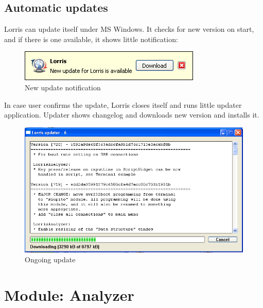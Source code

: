 \documentclass[12pt, a4paper, oneside]{article}
\begin{document}
\subsection{Automatic updates}
Lorris can update itself under MS Windows. It checks for new version on start, and if there is one available, it shows little notification:
\begin{figure}[H]
\begin{center}
\includegraphics[scale=1]{img/update_notify.png}
\caption{New update notification}
\end{center}
\end{figure}
In case user confirms the update, Lorris closes itself and runs little updater application. Updater shows changelog and downloads new version and installs it.
\begin{figure}[H]
\begin{center}
\includegraphics[scale=0.65]{img/updater.png}
\caption{Ongoing update}
\end{center}
\end{figure}

\setlength{\voffset}{0mm}
\addtolength{\textheight}{-20mm}
\newpage
\section{Module: Analyzer}
\end{document}
